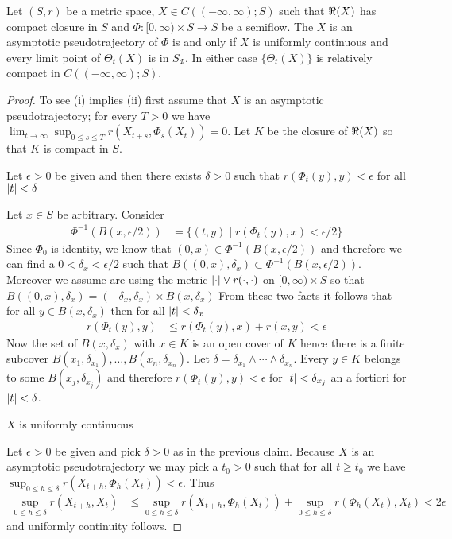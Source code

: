 \begin{thm}Let $(S,r)$ be a metric space, $X \in C((-\infty, \infty); S)$ such that $\Re(X)$ has compact closure in $S$ and $\Phi : [0,\infty) \times S \to S$ be a semiflow.  The $X$ is an asymptotic pseudotrajectory of $\Phi$ is and only if $X$ is uniformly continuous and every limit point of $\Theta_t(X)$ is in $S_\Phi$.  In either case $\lbrace \Theta_t(X) \rbrace$ is relatively compact in $C((-\infty, \infty); S)$.  
\end{thm}
\begin{proof}
To see (i) implies (ii) first assume that $X$ is an asymptotic pseudotrajectory; for every $T>0$ we have $\lim_{t \to \infty} \sup_{0 \leq s \leq T} r(X_{t+s}, \Phi_s(X_t)) =0$.  Let $K$ be the closure of $\Re(X)$ so that $K$ is compact in $S$.  
\begin{clm}Let $\epsilon > 0$ be given and then there exists $\delta>0$ such that $r(\Phi_t(y), y)<\epsilon$ for all $\left \vert t \right \vert < \delta$
\end{clm}
Let $x \in S$ be arbitrary.  Consider 
\begin{align*}
\Phi^{-1}( B(x, \epsilon/2)) &= \lbrace (t,y) \mid r(\Phi_t(y), x) < \epsilon/2 \rbrace
\end{align*}
Since $\Phi_0$ is identity, we know that $(0,x) \in \Phi^{-1}( B(x, \epsilon/2)) $ and therefore we can find a $0 < \delta_x < \epsilon/2$ such that $B((0,x), \delta_x) \subset \Phi^{-1}( B(x, \epsilon/2))$.  Moreover we assume are using the metric $\left \vert \cdot \right \vert \vee r(\cdot, \cdot)$ on $[0,\infty) \times S$ so that  $B((0,x), \delta_x) = (-\delta_x, \delta_x) \times B(x,\delta_x)$ From these two facts it follows that for all $y \in B(x, \delta_x)$ then for all $\left \vert t \right \vert < \delta_x$
\begin{align*}
r(\Phi_t(y), y) &\leq r(\Phi_t(y), x) + r(x,y) < \epsilon
\end{align*}
Now the set of $B(x, \delta_x)$ with $x \in K$ is an open cover of $K$ hence there is a finite subcover $B(x_1, \delta_{x_1}), \dotsc, B(x_n, \delta_{x_n})$.  Let $\delta = \delta_{x_1} \wedge \dotsb \wedge \delta_{x_n}$.  Every $y \in K$ belongs to some $B(x_j, \delta_{x_j})$ and therefore $r(\Phi_t(y), y) < \epsilon$ for $\left \vert t \right \vert < \delta_{x_j}$ an a fortiori for $\left \vert t \right \vert < \delta$.

\begin{clm}$X$ is uniformly continuous
\end{clm}
Let $\epsilon>0$ be given and pick $\delta>0$ as in the previous claim.  Because $X$ is an asymptotic pseudotrajectory we may pick a $t_0>0$ such that for all $t \geq t_0$ we have $\sup_{0 \leq h \leq \delta} r(X_{t+h}, \Phi_h(X_t)) < \epsilon$.  Thus
\begin{align*}
\sup_{0 \leq h \leq \delta} r(X_{t+h}, X_t) &\leq \sup_{0 \leq h \leq \delta} r(X_{t+h}, \Phi_h(X_t)) + \sup_{0 \leq h \leq \delta} r(\Phi_h(X_t), X_t) < 2\epsilon
\end{align*}
and uniformly continuity follows. 


\end{proof}
